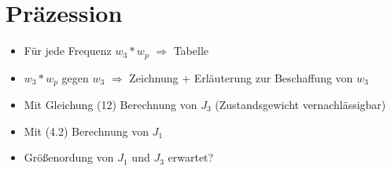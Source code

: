 

\section{Präzession}

\begin{itemize}
    \item Für jede Frequenz $w_3 * w_p$ $\Rightarrow$ Tabelle
    \item $w_3 * w_p$ gegen $w_3$ $\Rightarrow$ Zeichnung + Erläuterung zur Beschaffung von $w_3$
    \item Mit Gleichung (12) Berechnung von $J_3$ (Zustandsgewicht vernachlässigbar)
    \item Mit (4.2) Berechnung von $J_1$
    \item Größenordung von $J_1$ und $J_3$ erwartet?
\end{itemize}